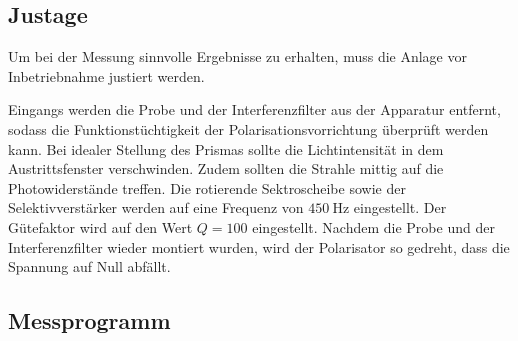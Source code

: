 \subsection{Justage}
Um bei der Messung sinnvolle Ergebnisse zu erhalten, muss die Anlage vor Inbetriebnahme justiert werden. 

Eingangs werden die Probe und der Interferenzfilter aus der Apparatur entfernt, sodass die Funktionstüchtigkeit der
Polarisationsvorrichtung überprüft werden kann. Bei idealer Stellung des Prismas sollte die Lichtintensität in dem 
Austrittsfenster verschwinden. Zudem sollten die Strahle mittig auf die Photowiderstände treffen. 
Die rotierende Sektroscheibe sowie der Selektivverstärker werden auf eine Frequenz von $\SI{450}{\hertz}$ eingestellt. 
Der Gütefaktor wird auf den Wert $Q=\num{100}$ eingestellt. 
Nachdem die Probe und der Interferenzfilter wieder montiert wurden, wird der Polarisator so gedreht, dass die Spannung auf Null
abfällt. 

\subsection{Messprogramm}